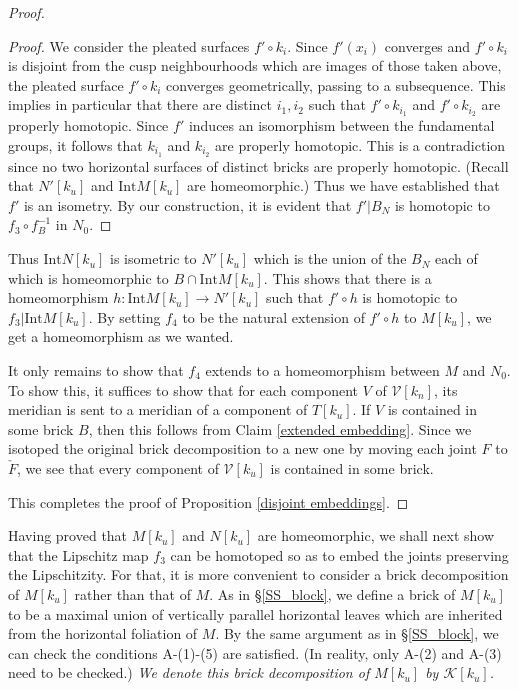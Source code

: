 \documentclass{amsart}
\theoremstyle{definition}
\numberwithin{figure}{section}
\numberwithin{equation}{section}
\def\ck{\mathcal{K}}
\def\cv{\mathcal{V}}
\def\Int{\mathrm{Int}}
\begin{document}
\begin{proof}
\begin{proof}
We consider the pleated surfaces $f' \circ k_i$.
Since $f'(x_i)$ converges and $f'\circ k_i$ is disjoint from the  cusp neighbourhoods which are images of those taken above, the pleated surface $f' \circ k_i$ converges geometrically, passing to a subsequence.
This implies in particular that there are distinct $i_1, i_2$ such that $f' \circ k_{i_1}$ and $f' \circ k_{i_2}$ are properly homotopic.
Since $f'$ induces an isomorphism between the fundamental groups, it follows that $k_{i_1}$ and $k_{i_2}$ are properly homotopic.
This is a contradiction since no two horizontal surfaces of distinct bricks are properly homotopic.
(Recall that $N'[k_u]$ and $\Int M[k_u]$ are homeomorphic.)
Thus we have established that $f'$ is an isometry.
By our construction, it is evident that $f'|B_N$ is homotopic to $f_3 \circ f_B^{-1}$ in $N_0$.
\end{proof}

Thus $\Int N[k_u]$ is isometric to $N'[k_u]$ which is the union of the $B_N$ each of which is homeomorphic to $B \cap \Int M[k_u]$.
This shows that there is a homeomorphism $h: \Int M[k_u] \rightarrow N'[k_u]$ such that $f' \circ h$ is homotopic to $f_3|\Int M[k_u]$.
By setting $f_4$ to be the natural extension of $f' \circ h$ to $M[k_u]$, we get a homeomorphism as we wanted.

It only remains to show that $f_4$ extends to a homeomorphism between $M$ and $N_0$.
To show this, it suffices to show that for each component $V$ of $\cv[k_n]$, its meridian is sent to a meridian of a component of $T[k_u]$.
If $V$ is contained in some brick $B$, then this follows from Claim \ref{extended embedding}.
Since we isotoped the original brick decomposition to a new one by moving each joint $F$ to $\check F$, we see that every component of $\cv[k_u]$ is contained in some brick.

This completes the proof of Proposition \ref{disjoint embeddings}.
\end{proof}


Having proved that $M[k_u]$ and $N[k_u]$ are homeomorphic, we shall next show that the Lipschitz map $f_3$ can be homotoped so as to embed the joints preserving the Lipschitzity.
For that, it is more convenient to consider a brick decomposition of $M[k_u]$ rather than that of $M$.
As in \S \ref{SS_block}, we define a brick of $M[k_u]$ to be a maximal union of vertically parallel horizontal leaves which are inherited from the horizontal foliation of $M$.
By the same argument as in \S \ref{SS_block}, we can check the conditions A-(1)-(5) are satisfied.
(In reality, only A-(2) and A-(3) need to be checked.)
{\em We denote this brick decomposition of $M[k_u]$ by $\ck[k_u]$.}
\end{document}
